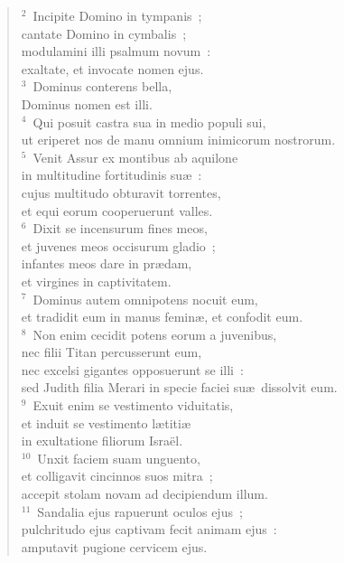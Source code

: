 \begin{flushleft}\begin{verse}\vspace{6pt}${}^{2}$~Incipite Domino in tympanis~;\\ cantate Domino in cymbalis~;\\ modulamini illi psalmum novum~:\\ exaltate, et invocate nomen ejus.\\
${}^{3}$~Dominus conterens bella,\\ Dominus nomen est illi.\\
${}^{4}$~Qui posuit castra sua in medio populi sui,\\ ut eriperet nos de manu omnium inimicorum nostrorum.\\
${}^{5}$~Venit Assur ex montibus ab aquilone\\ in multitudine fortitudinis su\ae~:\\ cujus multitudo obturavit torrentes,\\ et equi eorum cooperuerunt valles.\\
${}^{6}$~Dixit se incensurum fines meos,\\ et juvenes meos occisurum gladio~;\\ infantes meos dare in pr\ae dam,\\ et virgines in captivitatem.\\
${}^{7}$~Dominus autem omnipotens nocuit eum,\\ et tradidit eum in manus femin\ae , et confodit eum.\\
${}^{8}$~Non enim cecidit potens eorum a juvenibus,\\ nec filii Titan percusserunt eum,\\ nec excelsi gigantes opposuerunt se illi~:\\ sed Judith filia Merari in specie faciei su\ae\ dissolvit eum.\\
${}^{9}$~Exuit enim se vestimento viduitatis,\\ et induit se vestimento l\ae titi\ae \\ in exultatione filiorum Isra\"el.\\
${}^{10}$~Unxit faciem suam unguento,\\ et colligavit cincinnos suos mitra~;\\ accepit stolam novam ad decipiendum illum.\\
${}^{11}$~Sandalia ejus rapuerunt oculos ejus~;\\ pulchritudo ejus captivam fecit animam ejus~:\\ amputavit pugione cervicem ejus.\\

\end{verse}
\end{flushleft}
